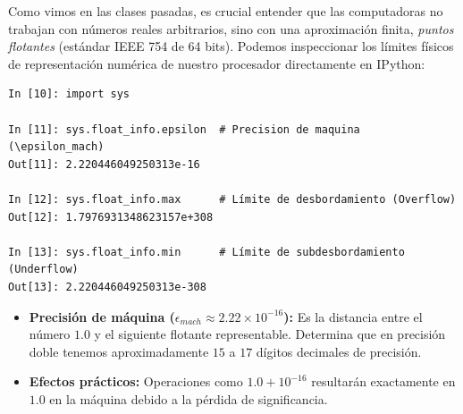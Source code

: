 \documentclass[12pt]{article}
\begin{document}
Como vimos en las clases pasadas, es crucial entender que las computadoras no trabajan con 
números reales arbitrarios, sino con una aproximación finita, \textit{puntos flotantes} 
(estándar IEEE 754 de 64 bits). 
Podemos inspeccionar los límites físicos de representación numérica de nuestro procesador 
directamente en IPython:

\begin{lstlisting}
In [10]: import sys

In [11]: sys.float_info.epsilon  # Precision de maquina (\epsilon_mach)
Out[11]: 2.220446049250313e-16

In [12]: sys.float_info.max      # Límite de desbordamiento (Overflow)
Out[12]: 1.7976931348623157e+308

In [13]: sys.float_info.min      # Límite de subdesbordamiento (Underflow)
Out[13]: 2.220446049250313e-308
\end{lstlisting}

\begin{itemize}
    \item \textbf{Precisión de máquina ($\epsilon_{mach} \approx 2.22 \times 10^{-16}$):} 
    Es la distancia entre el número $1.0$ y el siguiente flotante representable. Determina que en precisión doble tenemos aproximadamente $15$ a $17$ dígitos decimales de precisión.
    \item \textbf{Efectos prácticos:} Operaciones como $1.0 + 10^{-16}$ 
    resultarán exactamente en $1.0$ en la máquina debido a la pérdida de significancia.
\end{itemize}
\end{document}
